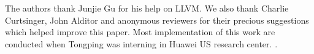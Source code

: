 The authors thank Junjie Gu for his help on LLVM. 
We also thank Charlie Curtsinger, John Alditor and anonymous reviewers for their precious suggestions which helped improve this paper. Most implementation of this work are conducted when Tongping was interning in Huawei 
US research center. .  
